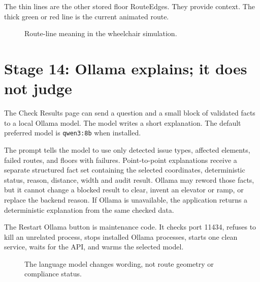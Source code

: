 \documentclass[11pt,a4paper]{article}
\newcommand{\code}[1]{\texttt{#1}}
\newcommand{\wheelchair}[2]{\begin{scope}[shift={(#1,#2)}]\draw[ink,line width=1.2pt] (-.25,-.18) circle (.18);\draw[ink,line width=1pt] (.26,-.2) circle (.09);\fill[blue!65!black] (-.15,.03) rectangle (.25,.25);\fill[purple!70] (-.08,.25) rectangle (.14,.47);\fill[orange!50] (.03,.58) circle (.12);\end{scope}}
\begin{document}
The thin lines are the other stored floor RouteEdges. They provide context. The thick green or red line is the current animated route.

\begin{figure}[H]\centering
{}
\caption{Route-line meaning in the wheelchair simulation.}
\end{figure}

\section{Stage 14: Ollama explains; it does not judge}
The Check Results page can send a question and a small block of validated facts to a local Ollama model. The model writes a short explanation. The default preferred model is \code{qwen3:8b} when installed.

The prompt tells the model to use only detected issue types, affected elements, failed routes, and floors with failures. Point-to-point explanations receive a separate structured fact set containing the selected coordinates, deterministic status, reason, distance, width and audit result. Ollama may reword those facts, but it cannot change a blocked result to clear, invent an elevator or ramp, or replace the backend reason. If Ollama is unavailable, the application returns a deterministic explanation from the same checked data.

The Restart Ollama button is maintenance code. It checks port 11434, refuses to kill an unrelated process, stops installed Ollama processes, starts one clean service, waits for the API, and warms the selected model.

\begin{figure}[H]\centering
{}
\caption{The language model changes wording, not route geometry or compliance status.}
\end{figure}
\end{document}
